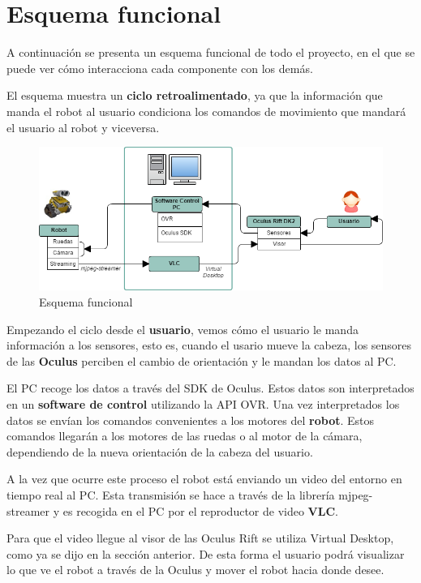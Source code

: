 \documentclass[twoside, 11pt]{epstfg}
\begin{document}
\newpage
\section{Esquema funcional}
A continuación se presenta un esquema funcional de todo el proyecto, en el que se puede ver cómo interacciona cada componente con los demás.

El esquema muestra un \textbf{ciclo retroalimentado}, ya que la información que manda el robot al usuario condiciona los comandos de movimiento que mandará el usuario al robot y viceversa.

\begin{figure}[h]
	\centerline{
		\mbox{\includegraphics[width=1\textwidth]{images/EsquemaFuncional.png}}
	}
	\caption{Esquema funcional}
\end{figure}

Empezando el ciclo desde el \textbf{usuario}, vemos cómo el usuario le manda información a los sensores, esto es, cuando el usario mueve la cabeza, los sensores de las \textbf{Oculus} perciben el cambio de orientación y le mandan los datos al PC.

El PC recoge los datos a través del SDK de Oculus. Estos datos son interpretados en un \textbf{software de control} utilizando la API OVR. Una vez interpretados los datos se envían los comandos convenientes a los motores del \textbf{robot}. Estos comandos llegarán a los motores de las ruedas o al motor de la cámara, dependiendo de la nueva orientación de la cabeza del usuario.

A la vez que ocurre este proceso el robot está enviando un video del entorno en tiempo real al PC. Esta transmisión se hace a través de la librería mjpeg-streamer y es recogida en el PC por el reproductor de video \textbf{VLC}.

Para que el video llegue al visor de las Oculus Rift se utiliza Virtual Desktop, como ya se dijo en la sección anterior. De esta forma el usuario podrá visualizar lo que ve el robot a través de la Oculus y mover el robot hacia donde desee.
\end{document}
